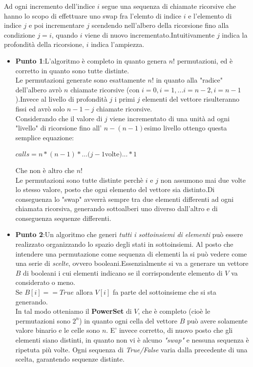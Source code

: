 \documentclass[a4paper]{article}
\begin{document}
Ad ogni incremento dell'indice $i$ segue una sequenza di chiamate ricorsive che hanno lo scopo di effettuare uno swap fra l'elemto di indice $i$ e l'elemento di indice $j$ e poi incrementare $j$ scendendo nell'albero della ricorsione fino alla condizione $j=i$, quando $i$ viene di nuovo incrementato.Intuitivamente $j$ indica la profondità della ricorsione, $i$ indica l'ampiezza.
\begin{itemize}
	\item \textbf{Punto 1}:L'algoritmo è completo in quanto genera $n!$ permutazioni, ed è corretto in quanto sono tutte distinte.\\Le permutazioni generate sono esattamente $n!$ in quanto alla "radice" dell'albero avrò $n$ chiamate ricorsive (con $i = 0, i=1, ... i= n-2, i=n-1$ ).Invece al livello di profondità $j$ i primi $j$ elementi del vettore risulteranno fissi ed avrò solo $n-1-j$ chiamate ricorsive.\\Considerando che il valore di $j$ viene incrementato di una unità ad ogni "livello" di ricorsione fino all' $n-(n-1)$esimo livello ottengo questa semplice equazione: \begin{center}$calls = n * (n-1) * ...(j-1$volte$)... * 1$\end{center}Che non è altro che $n!$\\
		Le permutazioni sono tutte distinte perchè $i$ e $j$ non assumono mai due volte lo stesso valore, posto che ogni elemento del vettore sia distinto.Di conseguenza lo "swap" avverrà sempre tra due elementi differenti ad ogni chiamata ricorsiva, generando sottoalberi uno diverso dall'altro e di conseguenza sequenze differenti.
	\item \textbf{Punto 2}:Un algoritmo che generi \textit{tutti i sottoinsiemi di elementi} può essere realizzato organizzando lo spazio degli stati in sottoinsiemi.
		Al posto che intendere una permutazione come sequenza di elementi la si può vedere come una serie di \textit{scelte}, ovvero booleani.Essenzialmente si va a generare un vettore $B$ di booleani i cui elementi indicano se il corrispondente elemento di $V$ va considerato o meno.\\
		Se $B[i] == True$ allora $V[i]$ fa parte del sottoinsieme che si sta generando.\\
		In tal modo otteniamo il \textbf{PowerSet} di $V$, che è completo (cioè le permutazioni sono $2^n$) in quanto ogni cella del vettore $B$ può avere solamente valore binario e le celle sono $n$.
		E' invece corretto, di nuovo posto che gli elementi siano distinti, in quanto non vi è alcuno \textit{"swap"} e nessuna sequenza è ripetuta più volte. Ogni sequenza di \textit{True/False} varia dalla precedente di una scelta, garantendo sequenze distinte.
\end{itemize}
\end{document}

